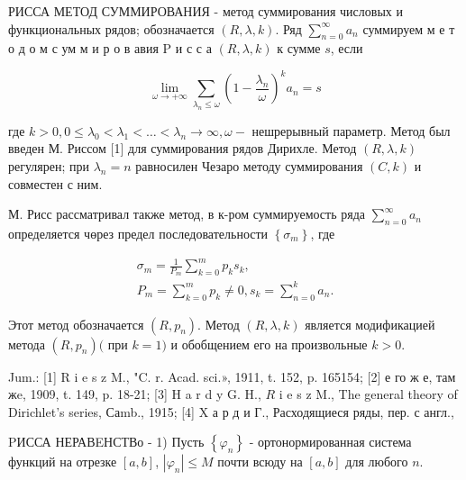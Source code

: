 \documentclass[10pt]{article}
\begin{document}
РИССА МЕТОД СУММИРОВАНИЯ - метод суммирования числовых и функциональных рядов; обозначается $(R, \lambda, k)$. Ряд $\sum_{n=0}^{\infty} a_{n}$ суммируем м е т о д о м с ум м и р о в авия $\mathrm{P}$ и с с а $(R, \lambda, k)$ к сумме $s$, если



\[

\lim _{\omega \rightarrow+\infty} \sum_{\lambda_{n} \leqslant \omega}\left(1-\frac{\lambda_{n}}{\omega}\right)^{k} a_{n}=s

\]



где $k>0,0 \leqslant \lambda_{0}<\lambda_{1}<\ldots<\lambda_{n} \rightarrow \infty, \omega-$ нешрерывный параметр. Метод был введен М. Риссом [1] для суммирования рядов Дирихле. Метод $(R, \lambda, k)$ регулярен; при $\lambda_{n}=n$ равносилен Чезаро методу суммирования $(C, k)$ и совместен с ним.



М. Рисс рассматривал также метод, в к-ром суммируемость ряда $\sum_{n=0}^{\infty} a_{n}$ определяется чөрез предел последовательности $\left\{\sigma_{m}\right\}$, где



\[

\begin{gathered}

\sigma_{m}=\frac{1}{P_{m}} \sum_{k=0}^{m} p_{k} s_{k}, \\

P_{m}=\sum_{k=0}^{m} p_{k} \neq 0, s_{k}=\sum_{n=0}^{k} a_{n} .

\end{gathered}

\]



Этот метод обозначается $\left(R, p_{n}\right)$. Метод $(R, \lambda, k)$ является модификацией метода $\left(R, p_{n}\right)($ при $k=1)$ и обобщением его на произвольные $k>0$.



Jum.: [1] R i e s z M., "C. r. Acad. sci.», 1911, t. 152, p. 165154; [2] е го ж е, там жe, 1909, t. 149, p. 18-21; [3] H a r d y G. H., $R$ i e s z M., The general theory of Dirichlet's series, Саmb., 1915; [4] X а р д и Г., Расходящиеся ряды, пер. с англ.,



PИССА НЕРАВEНСТВо - 1) Пусть $\left\{\varphi_{n}\right\}$ - ортонормированная система функций на отрезке $[a, b]$, $\left|\varphi_{n}\right| \leqslant M$ почти всюду на $[a, b]$ для любого $n$.
\end{document}
